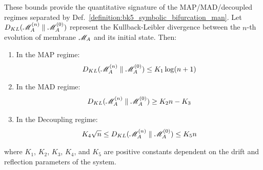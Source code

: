 \begin{lemma} \label{lemma:bk5_symbolic_divergence_bounds} 
These bounds provide the quantitative signature of the MAP/MAD/decoupled regimes separated by Def.~\ref{definition:bk5_symbolic_bifurcation_man}.
Let $D_{KL}(\mathscr{M}_A^{(n)} \parallel \mathscr{M}_A^{(0)})$ represent the Kullback-Leibler divergence between the $n$-th evolution of membrane $\mathscr{M}_A$ and its initial state. Then:
\begin{enumerate}
  \item[(i)] In the MAP regime:
  \begin{equation}
  D_{KL}(\mathscr{M}_A^{(n)} \parallel \mathscr{M}_A^{(0)}) \leq K_1 \log(n + 1)
  \end{equation}
  \item[(ii)] In the MAD regime:
  \begin{equation}
  D_{KL}(\mathscr{M}_A^{(n)} \parallel \mathscr{M}_A^{(0)}) \geq K_2 n - K_3
  \end{equation}
  \item[(iii)] In the Decoupling regime:
  \begin{equation}
  K_4 \sqrt{n} \leq D_{KL}(\mathscr{M}_A^{(n)} \parallel \mathscr{M}_A^{(0)}) \leq K_5 n
  \end{equation}
\end{enumerate}
\noindent where $K_1$, $K_2$, $K_3$, $K_4$, and $K_5$ are positive constants dependent on the drift and reflection parameters of the system.
\end{lemma}
